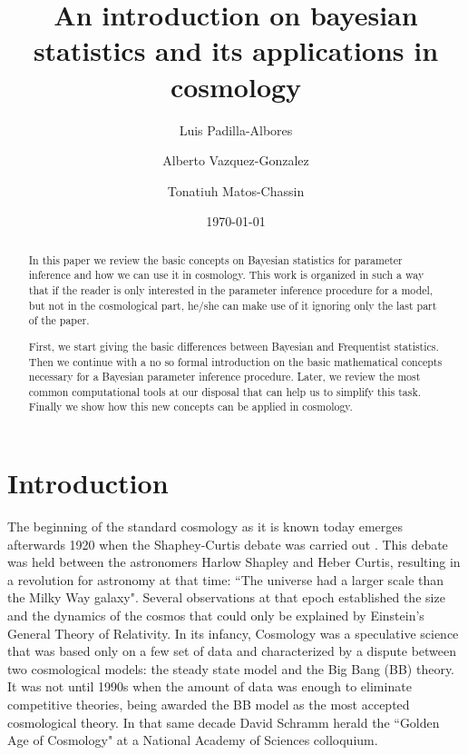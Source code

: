 \documentclass[onecolumn,           %
               showpacs,            %
               preprintnumbers,     %
               aps,                 %
               prl,          	    %
               letterpaper,             %
               superscriptaddress,      %
               nofootinbib,         %
               tightenlines,        %
               floats,floatfix      %
               ,usenatbib,
               ]{revtex4-1}
\begin{document}
\title{An introduction on bayesian statistics and its applications in cosmology}
\author{Luis Padilla-Albores}  
   \author{Alberto Vazquez-Gonzalez}  
  \author{Tonatiuh Matos-Chassin}  
\date{\today}

\begin{abstract}

In this paper we review the basic concepts on Bayesian statistics for parameter inference and how we can use it in cosmology. This work is organized in such a way that if the reader is only interested in the parameter inference procedure for a model, but not in the cosmological part, he/she can make use of it ignoring only the last part of the paper. 

First, we start giving the basic differences between Bayesian and Frequentist statistics. Then we continue with a no so formal introduction on the basic mathematical concepts necessary for a Bayesian parameter inference procedure. Later, we review the most common computational tools at our disposal that can help us to simplify this task. Finally we show how this new concepts can be applied in cosmology.     
\end{abstract}

\maketitle

\section{Introduction}

The beginning of the standard cosmology as it is known today emerges afterwards 1920 when the Shaphey-Curtis debate was carried out \cite{debate}. This debate was held between the astronomers Harlow Shapley and Heber Curtis, resulting in a revolution for astronomy at that time: ``The universe had a larger scale than the Milky Way galaxy". Several observations at that epoch established the size and the dynamics of the cosmos that could only be explained by Einstein's General Theory of Relativity. In its infancy, Cosmology was a speculative science that was based only on a few set of data and characterized by a dispute between two cosmological models: the steady state model and the Big Bang (BB) theory. It was not until 1990s when the amount of data was enough to eliminate competitive theories, being awarded the BB model as the most accepted cosmological theory. In that same decade David Schramm herald the ``Golden Age of Cosmology" at a National Academy of Sciences colloquium.    
\end{document}
